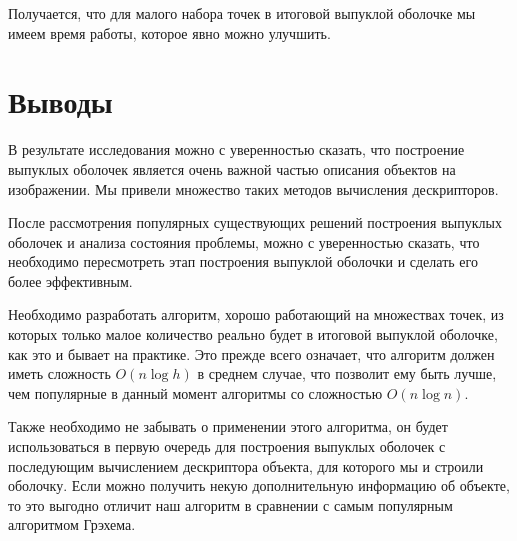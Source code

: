 Получается, что для малого набора точек в итоговой выпуклой оболочке мы имеем время работы, которое явно можно улучшить.

\section{Выводы} \label{subsect1_4}

В результате исследования можно с уверенностью сказать, что построение выпуклых оболочек является очень важной частью описания объектов на изображении. Мы привели множество таких методов вычисления дескрипторов.

После рассмотрения популярных существующих решений построения выпуклых оболочек и анализа состояния проблемы, можно с уверенностью сказать, что необходимо пересмотреть этап построения выпуклой оболочки и сделать его более эффективным.

Необходимо разработать алгоритм, хорошо работающий на множествах точек, из которых только малое количество реально будет в итоговой выпуклой оболочке, как это и бывает на практике. Это прежде всего означает, что алгоритм должен иметь сложность $O(n \log{h})$ в среднем случае, что позволит ему быть лучше, чем популярные в данный момент алгоритмы со сложностью $O(n \log{n})$.

Также необходимо не забывать о применении этого алгоритма, он будет использоваться в первую очередь для построения выпуклых оболочек с последующим вычислением дескриптора объекта, для которого мы и строили оболочку. Если можно получить некую дополнительную информацию об объекте, то это выгодно отличит наш алгоритм в сравнении с самым популярным алгоритмом Грэхема.


